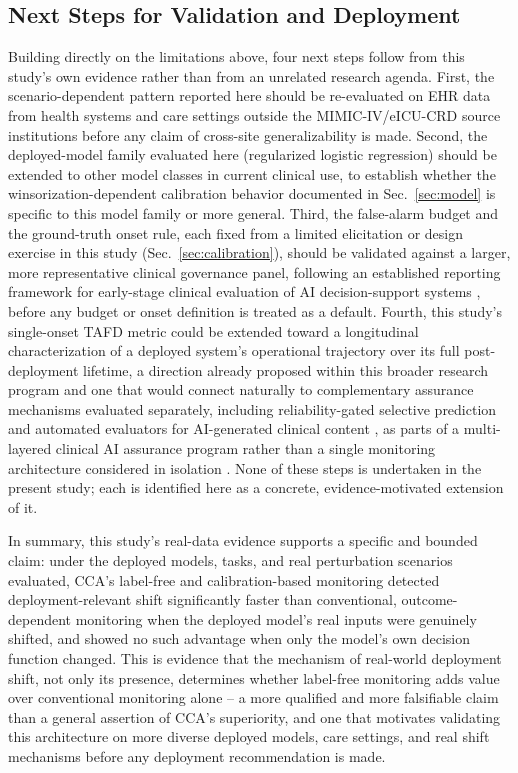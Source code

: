 \documentclass[apajournal,article,submit,oneauthor]{Definitions/mdpi}
\begin{document}
\subsection{Next Steps for Validation and Deployment}\label{sec:disc-nextsteps}

Building directly on the limitations above, four next steps follow from this study's own evidence rather than from an unrelated research agenda. First, the scenario-dependent pattern reported here should be re-evaluated on EHR data from health systems and care settings outside the MIMIC-IV/eICU-CRD source institutions before any claim of cross-site generalizability is made. Second, the deployed-model family evaluated here (regularized logistic regression) should be extended to other model classes in current clinical use, to establish whether the winsorization-dependent calibration behavior documented in Sec.~\ref{sec:model} is specific to this model family or more general. Third, the false-alarm budget and the ground-truth onset rule, each fixed from a limited elicitation or design exercise in this study (Sec.~\ref{sec:calibration}), should be validated against a larger, more representative clinical governance panel, following an established reporting framework for early-stage clinical evaluation of AI decision-support systems \citep{vasey2022}, before any budget or onset definition is treated as a default. Fourth, this study's single-onset TAFD metric could be extended toward a longitudinal characterization of a deployed system's operational trajectory over its full post-deployment lifetime, a direction already proposed within this broader research program \citep{yu2026predictability} and one that would connect naturally to complementary assurance mechanisms evaluated separately, including reliability-gated selective prediction \citep{yu2026deferral} and automated evaluators for AI-generated clinical content \citep{collaco2026llmjudge}, as parts of a multi-layered clinical AI assurance program rather than a single monitoring architecture considered in isolation \citep{yu2026assurancegovernance,yu2026monitoring}. None of these steps is undertaken in the present study; each is identified here as a concrete, evidence-motivated extension of it.

In summary, this study's real-data evidence supports a specific and bounded claim: under the deployed models, tasks, and real perturbation scenarios evaluated, CCA's label-free and calibration-based monitoring detected deployment-relevant shift significantly faster than conventional, outcome-dependent monitoring when the deployed model's real inputs were genuinely shifted, and showed no such advantage when only the model's own decision function changed. This is evidence that the mechanism of real-world deployment shift, not only its presence, determines whether label-free monitoring adds value over conventional monitoring alone -- a more qualified and more falsifiable claim than a general assertion of CCA's superiority, and one that motivates validating this architecture on more diverse deployed models, care settings, and real shift mechanisms before any deployment recommendation is made.
\end{document}
